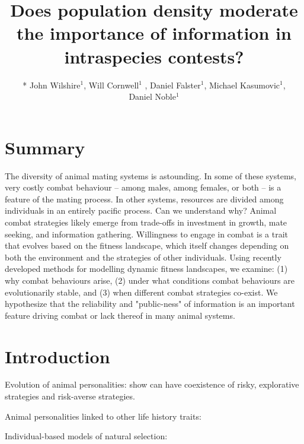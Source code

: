\documentclass[a4paper,11pt]{article}
\title{Does population density moderate the importance of information in intraspecies contests?}
\author{
* John Wilshire$^1$, Will Cornwell$^1$ , Daniel Falster$^1$, Michael Kasumovic$^1$, \\
Daniel Noble$^1$}
\affiliation{
*final list and order undecided\\
$^1$ University of NSW\\
}
\date{}
\begin{document}
\mstitlepage
\noindent

\section{Summary}
The diversity of animal mating systems is astounding. In some of these
systems, very costly combat behaviour -- among males, among females, or
both -- is a feature of the mating process.  In other systems, resources
are divided among individuals in an entirely pacific process.  Can we
understand why? Animal combat strategies likely emerge from trade-offs
in investment in growth, mate seeking, and information gathering.
Willingness to engage in combat is a trait that evolves based on the
fitness landscape, which itself changes depending on both the
environment and the strategies of other individuals.  Using recently
developed methods for modelling dynamic fitness landscapes, we examine:
(1) why combat behaviours arise, (2) under what conditions combat
behaviours are evolutionarily stable, and (3) when different combat
strategies co-exist.  We hypothesize that the reliability and
"public-ness" of information is an important feature driving combat or
lack thereof in many animal systems.

\section{Introduction}
Evolution of animal personalities: \citep{Wolf-2007,Wolf-2012} show can have
coexistence of risky, explorative strategies and risk-averse strategies.

Animal personalities linked to other life history traits: \citep{Biro-2008}

Individual-based models of natural selection: \citep{MGonigle-2012}
\end{document}
